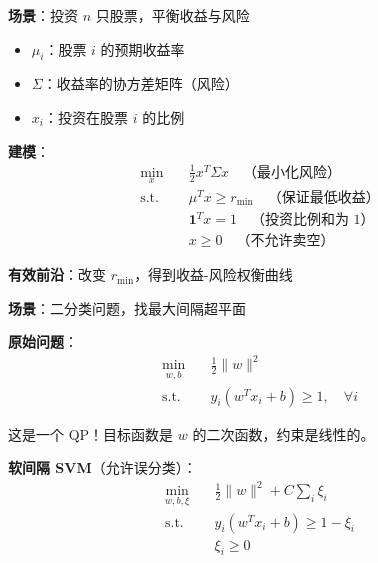 \documentclass[12pt, a4paper]{ctexart}
\begin{document}
\begin{blackboard}

\textbf{场景}：投资 $n$ 只股票，平衡收益与风险

\begin{itemize}
    \item $\mu_i$：股票 $i$ 的预期收益率
    \item $\Sigma$：收益率的协方差矩阵（风险）
    \item $x_i$：投资在股票 $i$ 的比例
\end{itemize}

\textbf{建模}：
\[
\begin{aligned}
\min_x \quad & \frac{1}{2} x^T \Sigma x \quad \text{（最小化风险）} \\
\text{s.t.} \quad & \mu^T x \geq r_{\min} \quad \text{（保证最低收益）} \\
& \mathbf{1}^T x = 1 \quad \text{（投资比例和为 1）} \\
& x \geq 0 \quad \text{（不允许卖空）}
\end{aligned}
\]

\textbf{有效前沿}：改变 $r_{\min}$，得到收益-风险权衡曲线

\begin{center}
\end{center}

\end{blackboard}

\begin{blackboard}

\textbf{场景}：二分类问题，找最大间隔超平面

\textbf{原始问题}：
\[
\begin{aligned}
\min_{w, b} \quad & \frac{1}{2} \|w\|^2 \\
\text{s.t.} \quad & y_i (w^T x_i + b) \geq 1, \quad \forall i
\end{aligned}
\]

这是一个 QP！目标函数是 $w$ 的二次函数，约束是线性的。

\textbf{软间隔 SVM}（允许误分类）：
\[
\begin{aligned}
\min_{w, b, \xi} \quad & \frac{1}{2} \|w\|^2 + C \sum_i \xi_i \\
\text{s.t.} \quad & y_i (w^T x_i + b) \geq 1 - \xi_i \\
& \xi_i \geq 0
\end{aligned}
\]

\end{blackboard}
\end{document}
